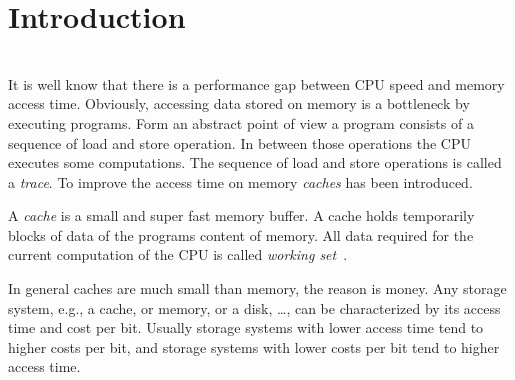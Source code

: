 \documentclass[onecolumn, openright, master, english, signatures]{dbrgrptt}
\begin{document}

%
\thesisdate{\today}%
%
%

\frontmatter%

%


\mainmatter%

\chapter{Introduction}\label{cha:introduction}
\torevise\\
It is well know that there is a performance gap between CPU speed and memory access time. Obviously, accessing data stored on memory is a bottleneck by executing programs. Form an abstract point of view a program consists of a sequence of load and store operation. In between those operations the CPU executes some computations. The sequence of load and store operations is called a \emph{trace}. To improve the access time on memory \emph{caches} has been introduced.

A \emph{cache} is a small and super fast memory buffer. A cache holds temporarily blocks of data of the programs content of memory. All data required for the current computation of the CPU is called \emph{working set}~\cite{denning1968working}.

In general caches are much small than memory, the reason is money. Any storage system, e.g., a cache, or memory, or a disk, \dots, can be characterized by its access time and cost per bit. Usually storage systems with lower access time tend to higher costs per bit, and storage systems with lower costs per bit tend to higher access time.
\end{document}
